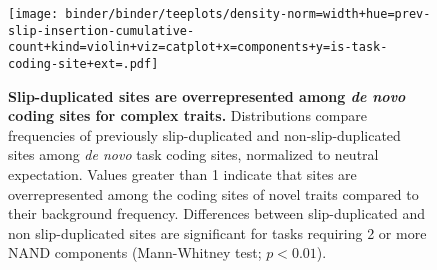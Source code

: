 \begin{figure}
\texttt{[image: binder/binder/teeplots/density-norm=width+hue=prev-slip-insertion-cumulative-count+kind=violin+viz=catplot+x=components+y=is-task-coding-site+ext=.pdf]}
\caption{%
  \textbf{Slip-duplicated sites are overrepresented among \textit{de novo} coding sites for complex traits.}
  \footnotesize
  Distributions compare frequencies of previously slip-duplicated and non-slip-duplicated sites among  \textit{de novo} task coding sites, normalized to neutral expectation.
  Values greater than 1 indicate that sites are overrepresented among the coding sites of novel traits compared to their background frequency.
  Differences between slip-duplicated and non slip-duplicated sites are significant for tasks requiring 2 or more NAND components (Mann-Whitney test; $p < 0.01$).
} \label{fig:potentiation}
\end{figure}

